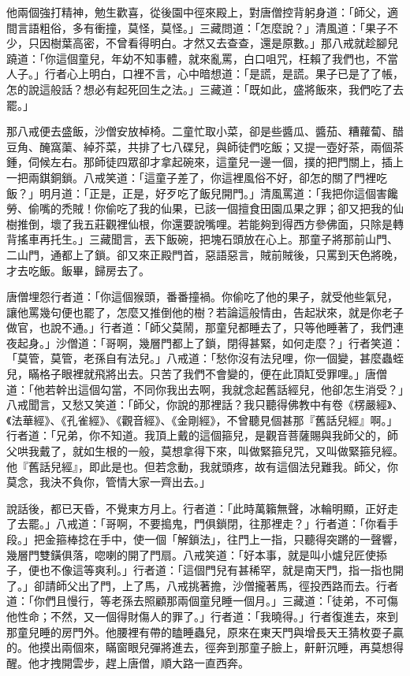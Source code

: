 他兩個強打精神，勉生歡喜，從後園中徑來殿上，對唐僧控背躬身道：「師父，適間言語粗俗，多有衝撞，莫怪，莫怪。」三藏問道：「怎麼說？」清風道：「果子不少，只因樹葉高密，不曾看得明白。才然又去查查，還是原數。」那八戒就趁腳兒蹺道：「你這個童兒，年幼不知事體，就來亂罵，白口咀咒，枉賴了我們也，不當人子。」行者心上明白，口裡不言，心中暗想道：「是謊，是謊。果子已是了了帳，怎的說這般話？想必有起死回生之法。」三藏道：「既如此，盛將飯來，我們吃了去罷。」

那八戒便去盛飯，沙僧安放棹椅。二童忙取小菜，卻是些醬瓜、醬茄、糟蘿蔔、醋豆角、醃窩蕖、綽芥菜，共排了七八碟兒，與師徒們吃飯；又提一壺好茶，兩個茶鍾，伺候左右。那師徒四眾卻才拿起碗來，這童兒一邊一個，撲的把門關上，插上一把兩錤銅鎖。八戒笑道：「這童子差了，你這裡風俗不好，卻怎的關了門裡吃飯？」明月道：「正是，正是，好歹吃了飯兒開門。」清風罵道：「我把你這個害饞勞、偷嘴的禿賊！你偷吃了我的仙果，已該一個擅食田園瓜果之罪；卻又把我的仙樹推倒，壞了我五莊觀裡仙根，你還要說嘴哩。若能夠到得西方參佛面，只除是轉背搖車再托生。」三藏聞言，丟下飯碗，把塊石頭放在心上。那童子將那前山門、二山門，通都上了鎖。卻又來正殿門首，惡語惡言，賊前賊後，只罵到天色將晚，才去吃飯。飯畢，歸房去了。

唐僧埋怨行者道：「你這個猴頭，番番撞禍。你偷吃了他的果子，就受他些氣兒，讓他罵幾句便也罷了，怎麼又推倒他的樹？若論這般情由，告起狀來，就是你老子做官，也說不通。」行者道：「師父莫鬧，那童兒都睡去了，只等他睡著了，我們連夜起身。」沙僧道：「哥啊，幾層門都上了鎖，閉得甚緊，如何走麼？」行者笑道：「莫管，莫管，老孫自有法兒。」八戒道：「愁你沒有法兒哩，你一個變，甚麼蟲蛭兒，瞞格子眼裡就飛將出去。只苦了我們不會變的，便在此頂缸受罪哩。」唐僧道：「他若幹出這個勾當，不同你我出去啊，我就念起舊話經兒，他卻怎生消受？」八戒聞言，又愁又笑道：「師父，你說的那裡話？我只聽得佛教中有卷《楞嚴經》、《法華經》、《孔雀經》、《觀音經》、《金剛經》，不曾聽見個甚那『舊話兒經』啊。」行者道：「兄弟，你不知道。我頂上戴的這個箍兒，是觀音菩薩賜與我師父的，師父哄我戴了，就如生根的一般，莫想拿得下來，叫做緊箍兒咒，又叫做緊箍兒經。他『舊話兒經』，即此是也。但若念動，我就頭疼，故有這個法兒難我。師父，你莫念，我決不負你，管情大家一齊出去。」

說話後，都已天昏，不覺東方月上。行者道：「此時萬籟無聲，冰輪明顯，正好走了去罷。」八戒道：「哥啊，不要搗鬼，門俱鎖閉，往那裡走？」行者道：「你看手段。」把金箍棒捻在手中，使一個「解鎖法」，往門上一指，只聽得突蹡的一聲響，幾層門雙鐄俱落，唿喇的開了門扇。八戒笑道：「好本事，就是叫小爐兒匠使掭子，便也不像這等爽利。」行者道：「這個門兒有甚稀罕，就是南天門，指一指也開了。」卻請師父出了門，上了馬，八戒挑著擔，沙僧攏著馬，徑投西路而去。行者道：「你們且慢行，等老孫去照顧那兩個童兒睡一個月。」三藏道：「徒弟，不可傷他性命；不然，又一個得財傷人的罪了。」行者道：「我曉得。」行者復進去，來到那童兒睡的房門外。他腰裡有帶的瞌睡蟲兒，原來在東天門與增長天王猜枚耍子贏的。他摸出兩個來，瞞窗眼兒彈將進去，徑奔到那童子臉上，鼾鼾沉睡，再莫想得醒。他才拽開雲步，趕上唐僧，順大路一直西奔。

